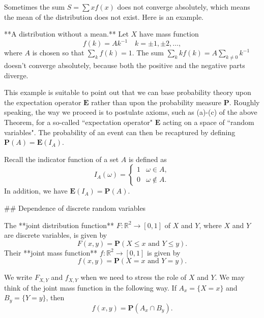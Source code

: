 Sometimes the sum $S = \sum xf(x)$ does not converge absolutely, which means the mean of the distribution does not exist. Here is an example. 
\begin{example}
**A distribution without a mean.** Let $X$ have mass function 
\begin{equation*}
    f(k) = Ak^{-1} \quad k = \pm 1, \pm 2, \dots,
\end{equation*}
where $A$ is chosen so that $\sum_k f(k) = 1$. The sum $\sum_k kf(k) = A\sum_{k\neq 0} k^{-1}$ doesn't converge absolutely, because both the positive and the negative parts diverge. 
\end{example}
This example is suitable to point out that we can base probability theory upon the expectation operator $\mathbf{E}$ rather than upon the probability measure $\mathbf{P}$. Roughly speaking, the way we proceed is to postulate axioms, such as (a)-(c) of the above Theorem, for a so-called ``expectation operator" $\mathbf{E}$ acting on a space of ``random variables". The probability of an event can then be recaptured by defining $\mathbf{P}(A) = \mathbf{E}(I_A)$.  

Recall the indicator function of a set $A$ is defined as
\begin{equation*}
    I_A(\omega) = \begin{cases} 1 & \omega \in A, \\
    0 & \omega \not\in A. \end{cases}
\end{equation*}
In addition, we have $\mathbf{E}(I_A) = \mathbf{P}(A)$.


## Dependence of discrete random variables
\begin{definition}
The **joint distribution function** $F:\mathbb{R}^2 \to [0,1]$ of $X$ and $Y$, where $X$ and $Y$ are discrete variables, is given by 
\begin{equation*}
    F(x, y) = \mathbf{P}(X\leq x \text{ and } Y \leq y). 
\end{equation*}
Their **joint mass function** $f:\mathbb{R}^2 \to [0,1]$ is given by 
\begin{equation*}
    f(x,y) = \mathbf{P}(X = x \text{ and } Y = y). 
\end{equation*}
\end{definition}

We write $F_{X,Y}$ and $f_{X,Y}$ when we need to stress the role of $X$ and $Y$. We may think of the joint mass function in the following way. If $A_x = \{X = x\}$ and $B_y = \{Y = y\}$, then 
\begin{equation*}
    f(x,y) = \mathbf{P}(A_x \cap B_y).
\end{equation*}

